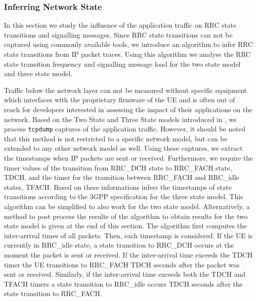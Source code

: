 \subsubsection*{Inferring Network State}\label{sec:network:network_traces:performance_evaluation:inferring_network_state}
In this section we study the influence of the application traffic on \gls{RRC} state transitions and signalling messages.
Since \gls{RRC} state transitions can not be captured using commonly available tools, we introduce an algorithm to infer \gls{RRC} state transitions from \gls{IP} packet traces.
Using this algorithm we analyse the \gls{RRC} state transition frequency and signalling message load for the two state model and three state model.

Traffic below the network layer can not be measured without specific equipment which interfaces with the proprietary firmware of the \gls{UE} and is often out of reach for developers interested in assessing the impact of their applications on the network.
Based on the Two State and Three State models introduced in , we process \texttt{tcpdump} captures of the application traffic.
However, it should be noted that this method is not restricted to a specific network model, but can be extended to any other network model as well.
Using these captures, we extract the timestamps when \gls{IP} packets are sent or received.
Furthermore, we require the timer values of the transition from \gls{RRC_DCH} state to \gls{RRC_FACH} state, \gls{TDCH}, and the timer for the transition between \gls{RRC_FACH} and \gls{RRC_idle} states, \gls{TFACH}.
Based on these informations  infers the timestamps of state transitions according to the \gls{3GPP} specification \cite{3GPP_RRC_Spec} for the three state model.
This algorithm can be simplified to also work for the two state model. 
Alternatively, a method to post process the results of the algorithm to obtain results for the two state model is given at the end of this section.
The algorithm first computes the inter-arrival times of all packets.
Then, each timestamp is considered.
If the \gls{UE} is currently in \gls{RRC_idle} state, a state transition to \gls{RRC_DCH} occurs at the moment the packet is sent or received.
If the inter-arrival time exceeds the \gls{TDCH} timer the \gls{UE} transitions to \gls{RRC_FACH} \gls{TDCH} seconds after the packet was sent or received.
Similarly, if the inter-arrival time exceeds both the \gls{TDCH} and \gls{TFACH} timers a state transition to \gls{RRC_idle} occurs \gls{TDCH} seconds after the state transition to \gls{RRC_FACH}.

